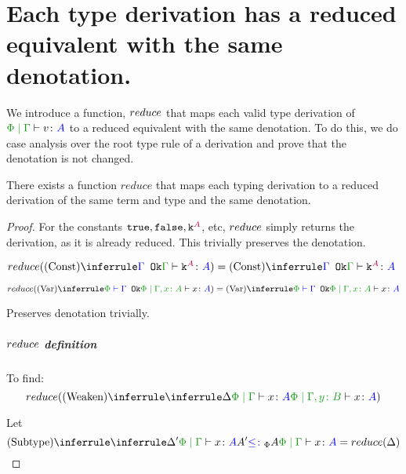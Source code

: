 \documentclass{report}
\begin{document}
    \section{Each type derivation has a reduced equivalent with the same denotation.}
    We introduce a function, $reduce$ that maps each valid type derivation of $\gpetyperelation{v}{A}$ to a reduced equivalent with the same denotation. To do this, we do case analysis over the root type rule of a derivation and prove that the denotation is not changed.
\begin{theorem}
    There exists a function $reduce$ that maps each typing derivation to a reduced derivation of the same term and type and the same denotation.
\end{theorem}
\begin{framed}
    \begin{proof}
        
                    For the constants $\texttt{true}, \texttt{false}, \texttt{k}^{\color{purple} A}$, etc, $reduce$ simply returns the derivation, as it is already reduced. This trivially preserves the denotation.
        
                    $\reduce(\truleconst) = \truleconst$
        
                    \case{\vvar}
                    \begin{equation}
                        \reduce(\ntreeruleI{\vvar}{\wellformedok{\P}{\G}}{\etyperelation{\P}{\gax}{x}{A}}) =  \ntreeruleI{\vvar}{\wellformedok{\P}{\G}}{\etyperelation{\P}{\gax}{x}{A}}
                    \end{equation}
        
                    Preserves denotation trivially.
        
                    \case{\vweaken}
                    \subparagraph{$reduce$ definition}
                    To find:
                    \begin{equation}
                        \reduce(\ntreeruleI{\vweaken}{\treeruleI{\D}{\gpetyperelation{x}{A}}}{\etyperelation{\P}{\gby}{x}{A}})
                    \end{equation}
        
                    Let 
                    \begin{equation}\label{WeakenDeltaReduction}
                        \ntreeruleII{\vsubtype}{\treeruleI{\D'}{\gpetyperelation{x}{A}}}{ A'\subtypep A}{\gpetyperelation{x}{A}} = \reduce(\D)
                    \end{equation}
        

\end{proof}
\end{framed}
\end{document}
